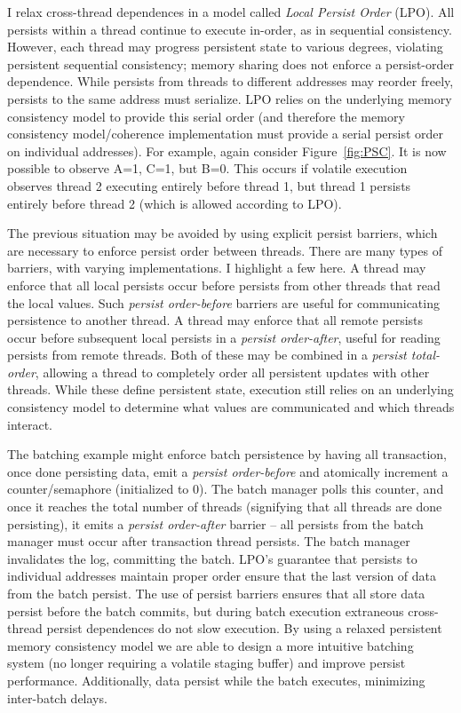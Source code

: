 I relax cross-thread dependences in a model called \emph{Local Persist Order} (LPO).
All persists within a thread continue to execute in-order, as in sequential consistency.
However, each thread may progress persistent state to various degrees, violating persistent sequential consistency; memory sharing does not enforce a persist-order dependence.
While persists from threads to different addresses may reorder freely, persists to the same address must serialize.
LPO relies on the underlying memory consistency model to provide this serial order (and therefore the memory consistency model/coherence implementation must provide a serial persist order on individual addresses).
For example, again consider Figure~\ref{fig:PSC}.
It is now possible to observe A=1, C=1, but B=0.
This occurs if volatile execution observes thread 2 executing entirely before thread 1, but thread 1 persists entirely before thread 2 (which is allowed according to LPO).

The previous situation may be avoided by using explicit persist barriers, which are necessary to enforce persist order between threads.
There are many types of barriers, with varying implementations.
I highlight a few here.
A thread may enforce that all local persists occur before persists from other threads that read the local values.
Such \emph{persist order-before} barriers are useful for communicating persistence to another thread.
A thread may enforce that all remote persists occur before subsequent local persists in a \emph{persist order-after}, useful for reading persists from remote threads.
Both of these may be combined in a \emph{persist total-order}, allowing a thread to completely order all persistent updates with other threads.
While these define persistent state, execution still relies on an underlying consistency model to determine what values are communicated and which threads interact.

The batching example might enforce batch persistence by having all transaction, once done persisting data, emit a \emph{persist order-before} and atomically increment a counter/semaphore (initialized to 0).
The batch manager polls this counter, and once it reaches the total number of threads (signifying that all threads are done persisting), it emits a \emph{persist order-after} barrier -- all persists from the batch manager must occur after transaction thread persists.
The batch manager invalidates the log, committing the batch.
LPO's guarantee that persists to individual addresses maintain proper order ensure that the last version of data from the batch persist.
The use of persist barriers ensures that all store data persist before the batch commits, but during batch execution extraneous cross-thread persist dependences do not slow execution.
By using a relaxed persistent memory consistency model we are able to design a more intuitive batching system (no longer requiring a volatile staging buffer) and improve persist performance.
Additionally, data persist while the batch executes, minimizing inter-batch delays.

